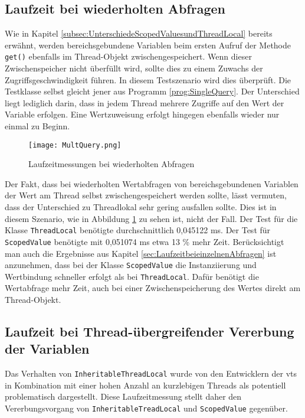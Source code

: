 \subsection{Laufzeit bei wiederholten Abfragen}
\label{sec:LaufzeitbeiwiederholtenAbfragen}

    Wie in Kapitel \ref{subsec:UnterschiedeScopedValuesundThreadLocal} bereits erwähnt, werden bereichsgebundene Variablen beim ersten Aufruf der Methode \texttt{get()} ebenfalls im Thread-Objekt 
    zwischengespeichert. Wenn dieser Zwischenspeicher nicht überfüllt wird, sollte dies zu einem Zuwachs der Zugriffsgeschwindigkeit führen. In diesem Testszenario wird dies überprüft.
    Die Testklasse selbst gleicht jener aus Programm \ref{prog:SingleQuery}. Der Unterschied liegt lediglich darin, dass in jedem Thread mehrere Zugriffe auf den Wert der Variable erfolgen. Eine 
    Wertzuweisung erfolgt hingegen ebenfalls wieder nur einmal zu Beginn.


    \begin{figure}[H]
        \centering
        \texttt{[image: MultQuery.png]}
        \caption{Laufzeitmessungen bei wiederholten Abfragen}
        \label{fig:MultQuery}
    \end{figure}

    Der Fakt, dass bei wiederholten Wertabfragen von bereichsgebundenen Variablen der Wert am Thread selbst zwischengespeichert werden sollte, lässt vermuten, dass der Unterschied zu Threadlokal 
    sehr gering ausfallen sollte. Dies ist in diesem Szenario, wie in Abbildung \ref{fig:MultQuery} zu sehen ist, nicht der Fall. Der Test für die Klasse \texttt{ThreadLocal} benötigte
    durchschnittlich 0,045122 ms. Der Test für \texttt{ScopedValue} benötigte mit 0,051074 ms etwa 13 \% mehr Zeit. Berücksichtigt man auch die Ergebnisse aus Kapitel \ref{sec:LaufzeitbeieinzelnenAbfragen}
    ist anzunehmen, dass bei der Klasse \texttt{ScopedValue} die Instanziierung und Wertbindung schneller erfolgt als bei \texttt{ThreadLocal}. Dafür benötigt die Wertabfrage mehr Zeit, auch bei einer 
    Zwischenspeicherung des Wertes direkt am Thread-Objekt.

\subsection{Laufzeit bei Thread-übergreifender Vererbung der Variablen}
\label{sec:LaufzeitbeiVererbung}

    Das Verhalten von \texttt{InheritableThreadLocal} wurde von den Entwicklern der \Glspl{vt} in Kombination mit einer hohen Anzahl an kurzlebigen Threads als potentiell problematisch 
    dargestellt. Diese Laufzeitmessung stellt daher den Vererbungsvorgang von \texttt{InheritableTreadLocal} und \texttt{ScopedValue} gegenüber.

